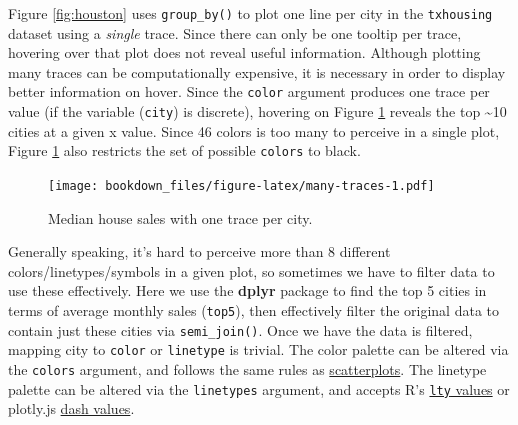 \documentclass[12pt,]{isuthesis}
\newenvironment{Shaded}{\begin{snugshade}}{\end{snugshade}}
\newcommand{\KeywordTok}[1]{\textcolor[rgb]{0.13,0.29,0.53}{\textbf{{#1}}}}
\newcommand{\DataTypeTok}[1]{\textcolor[rgb]{0.13,0.29,0.53}{{#1}}}
\newcommand{\FloatTok}[1]{\textcolor[rgb]{0.00,0.00,0.81}{{#1}}}
\newcommand{\StringTok}[1]{\textcolor[rgb]{0.31,0.60,0.02}{{#1}}}
\newcommand{\NormalTok}[1]{{#1}}
\begin{document}
Figure \ref{fig:houston} uses \texttt{group\_by()} to plot one line per
city in the \texttt{txhousing} dataset using a \emph{single} trace.
Since there can only be one tooltip per trace, hovering over that plot
does not reveal useful information. Although plotting many traces can be
computationally expensive, it is necessary in order to display better
information on hover. Since the \texttt{color} argument produces one
trace per value (if the variable (\texttt{city}) is discrete), hovering
on Figure \ref{fig:many-traces} reveals the top \textasciitilde{}10
cities at a given x value. Since 46 colors is too many to perceive in a
single plot, Figure \ref{fig:many-traces} also restricts the set of
possible \texttt{colors} to black.

\begin{Shaded}
\end{Shaded}

\begin{figure}[htbp]
\centering
\texttt{[image: bookdown\_files/figure-latex/many-traces-1.pdf]}
\caption{\label{fig:many-traces}Median house sales with one trace per city.}
\end{figure}

Generally speaking, it's hard to perceive more than 8 different
colors/linetypes/symbols in a given plot, so sometimes we have to filter
data to use these effectively. Here we use the \textbf{dplyr} package to
find the top 5 cities in terms of average monthly sales (\texttt{top5}),
then effectively filter the original data to contain just these cities
via \texttt{semi\_join()}. Once we have the data is filtered, mapping
city to \texttt{color} or \texttt{linetype} is trivial. The color
palette can be altered via the \texttt{colors} argument, and follows the
same rules as \protect\hyperlink{scatterplots}{scatterplots}. The
linetype palette can be altered via the \texttt{linetypes} argument, and
accepts R's
\href{https://github.com/wch/r-source/blob/e5b21d0397c607883ff25cca379687b86933d730/src/library/graphics/man/par.Rd\#L726-L743}{\texttt{lty}
values} or plotly.js
\href{https://plot.ly/r/reference/\#scatter-line-dash}{dash values}.
\end{document}
